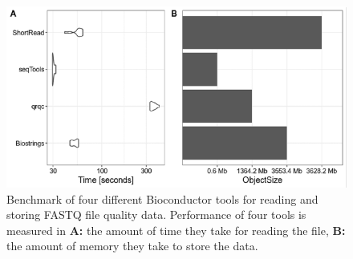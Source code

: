 \documentclass[12pt,twoside]{reedthesis}
\begin{document}
\begin{figure}[H]

{\centering \includegraphics{thesis_files/figure-latex/3f3-1} 

}

\caption{Benchmark of four different Bioconductor tools for reading and storing FASTQ file quality data. Performance of four tools is measured in \textbf{A:} the amount of time they take for reading the file, \textbf{B:} the amount of memory they take to store the data.}\label{fig:3f3}
\end{figure}
\end{document}
